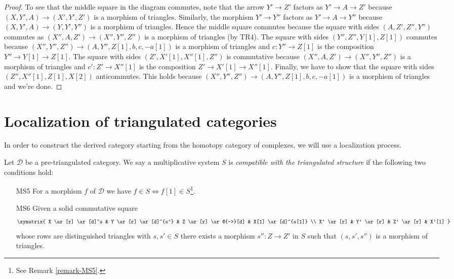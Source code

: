 \begin{proof}
\medskip\noindent
To see that the middle square in the diagram commutes, note
that the arrow $Y' \to Z'$ factors as $Y' \to A \to Z'$
because $(X, Y', A) \to (X', Y', Z')$ is a morphism of triangles.
Similarly, the morphism $Y' \to Y''$ factors as
$Y' \to A \to Y''$ because $(X, Y', A) \to (Y, Y', Y'')$ is a
morphism of triangles. Hence the middle square commutes because
the square with sides $(A, Z', Z'', Y'')$ commutes as
$(X'', A, Z') \to (X'', Y'', Z'')$ is a morphism of triangles (by TR4).
The square with sides $(Y'', Z'', Y[1], Z[1])$ commutes
because $(X'', Y'', Z'') \to (A, Y'', Z[1], b, c , -a[1])$
is a morphism of triangles and $c : Y'' \to Z[1]$ is the composition
$Y'' \to Y[1] \to Z[1]$.
The square with sides $(Z', X'[1], X''[1], Z'')$ is commutative
because $(X'', A, Z') \to (X'', Y'', Z'')$ is a morphism of triangles
and $c' : Z' \to X''[1]$ is the composition $Z' \to X'[1] \to X''[1]$.
Finally, we have to show that the square with sides
$(Z'', X''[1], Z[1], X[2])$ anticommutes. This holds because
$(X'', Y'', Z'') \to (A, Y'', Z[1], b, c , -a[1])$
is a morphism of triangles and we're done.
\end{proof}








\section{Localization of triangulated categories}
\label{section-localization}

\noindent
In order to construct the derived category starting from the homotopy
category of complexes, we will use a localization process.

\begin{definition}
\label{definition-localization}
Let $\mathcal{D}$ be a pre-triangulated category. We say a multiplicative
system $S$ is {\it compatible with the triangulated structure} if
the following two conditions hold:
\begin{enumerate}
\item[MS5] For a morphism $f$ of $\mathcal{D}$ we have
$f \in S \Leftrightarrow f[1] \in S$\footnote{See Remark \ref{remark-MS5}.}.
\item[MS6] Given a solid commutative square
$$
\xymatrix{
X \ar[r] \ar[d]^s &
Y \ar[r] \ar[d]^{s'} &
Z \ar[r] \ar@{-->}[d] &
X[1] \ar[d]^{s[1]} \\
X' \ar[r] &
Y' \ar[r] &
Z' \ar[r] &
X'[1]
}
$$
whose rows are distinguished triangles with $s, s' \in S$
there exists a morphism $s'' : Z \to Z'$ in $S$ such that
$(s, s', s'')$ is a morphism of triangles.
\end{enumerate}
\end{definition}

